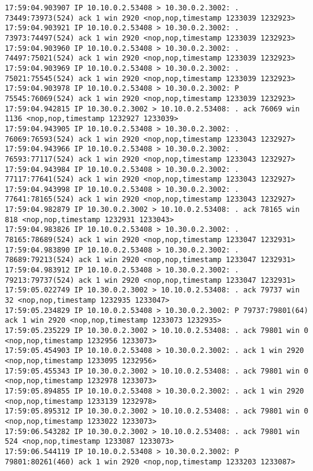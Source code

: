 \documentclass[a4paper,12pt]{article}
\begin{document}
\begin{Verbatim}
17:59:04.903907 IP 10.10.0.2.53408 > 10.30.0.2.3002: . 73449:73973(524) ack 1 win 2920 <nop,nop,timestamp 1233039 1232923>
17:59:04.903921 IP 10.10.0.2.53408 > 10.30.0.2.3002: . 73973:74497(524) ack 1 win 2920 <nop,nop,timestamp 1233039 1232923>
17:59:04.903960 IP 10.10.0.2.53408 > 10.30.0.2.3002: . 74497:75021(524) ack 1 win 2920 <nop,nop,timestamp 1233039 1232923>
17:59:04.903969 IP 10.10.0.2.53408 > 10.30.0.2.3002: . 75021:75545(524) ack 1 win 2920 <nop,nop,timestamp 1233039 1232923>
17:59:04.903978 IP 10.10.0.2.53408 > 10.30.0.2.3002: P 75545:76069(524) ack 1 win 2920 <nop,nop,timestamp 1233039 1232923>
17:59:04.942815 IP 10.30.0.2.3002 > 10.10.0.2.53408: . ack 76069 win 1136 <nop,nop,timestamp 1232927 1233039>
17:59:04.943905 IP 10.10.0.2.53408 > 10.30.0.2.3002: . 76069:76593(524) ack 1 win 2920 <nop,nop,timestamp 1233043 1232927>
17:59:04.943966 IP 10.10.0.2.53408 > 10.30.0.2.3002: . 76593:77117(524) ack 1 win 2920 <nop,nop,timestamp 1233043 1232927>
17:59:04.943984 IP 10.10.0.2.53408 > 10.30.0.2.3002: . 77117:77641(524) ack 1 win 2920 <nop,nop,timestamp 1233043 1232927>
17:59:04.943998 IP 10.10.0.2.53408 > 10.30.0.2.3002: . 77641:78165(524) ack 1 win 2920 <nop,nop,timestamp 1233043 1232927>
17:59:04.982879 IP 10.30.0.2.3002 > 10.10.0.2.53408: . ack 78165 win 818 <nop,nop,timestamp 1232931 1233043>
17:59:04.983826 IP 10.10.0.2.53408 > 10.30.0.2.3002: . 78165:78689(524) ack 1 win 2920 <nop,nop,timestamp 1233047 1232931>
17:59:04.983890 IP 10.10.0.2.53408 > 10.30.0.2.3002: . 78689:79213(524) ack 1 win 2920 <nop,nop,timestamp 1233047 1232931>
17:59:04.983912 IP 10.10.0.2.53408 > 10.30.0.2.3002: . 79213:79737(524) ack 1 win 2920 <nop,nop,timestamp 1233047 1232931>
17:59:05.022749 IP 10.30.0.2.3002 > 10.10.0.2.53408: . ack 79737 win 32 <nop,nop,timestamp 1232935 1233047>
17:59:05.234829 IP 10.10.0.2.53408 > 10.30.0.2.3002: P 79737:79801(64) ack 1 win 2920 <nop,nop,timestamp 1233073 1232935>
17:59:05.235229 IP 10.30.0.2.3002 > 10.10.0.2.53408: . ack 79801 win 0 <nop,nop,timestamp 1232956 1233073>
17:59:05.454903 IP 10.10.0.2.53408 > 10.30.0.2.3002: . ack 1 win 2920 <nop,nop,timestamp 1233095 1232956>
17:59:05.455343 IP 10.30.0.2.3002 > 10.10.0.2.53408: . ack 79801 win 0 <nop,nop,timestamp 1232978 1233073>
17:59:05.894855 IP 10.10.0.2.53408 > 10.30.0.2.3002: . ack 1 win 2920 <nop,nop,timestamp 1233139 1232978>
17:59:05.895312 IP 10.30.0.2.3002 > 10.10.0.2.53408: . ack 79801 win 0 <nop,nop,timestamp 1233022 1233073>
17:59:06.543282 IP 10.30.0.2.3002 > 10.10.0.2.53408: . ack 79801 win 524 <nop,nop,timestamp 1233087 1233073>
17:59:06.544119 IP 10.10.0.2.53408 > 10.30.0.2.3002: P 79801:80261(460) ack 1 win 2920 <nop,nop,timestamp 1233203 1233087>

\end{Verbatim}
\end{document}
